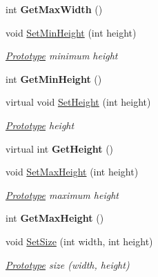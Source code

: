 \begin{DoxyCompactItemize}
int {\bfseries Get\+Max\+Width} ()
\item 
void \mbox{\hyperlink{class_space_v_i_l_1_1_prototype_ab615ad8a0985630fa96cf13d7484a4bc}{Set\+Min\+Height}} (int height)
\begin{DoxyCompactList}\small\item\em \mbox{\hyperlink{class_space_v_i_l_1_1_prototype}{Prototype}} minimum height \end{DoxyCompactList}\item 
\mbox{\label{class_space_v_i_l_1_1_prototype_ab755c8b94d71a61794208f1b3ac37b41}} 
int {\bfseries Get\+Min\+Height} ()
\item 
virtual void \mbox{\hyperlink{class_space_v_i_l_1_1_prototype_adc0adcbd1c3800d9525798ba7be5832a}{Set\+Height}} (int height)
\begin{DoxyCompactList}\small\item\em \mbox{\hyperlink{class_space_v_i_l_1_1_prototype}{Prototype}} height \end{DoxyCompactList}\item 
\mbox{\label{class_space_v_i_l_1_1_prototype_a2bd80c817b8a1708ab8f797dbebb3839}} 
virtual int {\bfseries Get\+Height} ()
\item 
void \mbox{\hyperlink{class_space_v_i_l_1_1_prototype_ae36a8ab0a4dff36218f56ae4cc9d39d4}{Set\+Max\+Height}} (int height)
\begin{DoxyCompactList}\small\item\em \mbox{\hyperlink{class_space_v_i_l_1_1_prototype}{Prototype}} maximum height \end{DoxyCompactList}\item 
\mbox{\label{class_space_v_i_l_1_1_prototype_aa8c79f15b51050a4dc941c9005530902}} 
int {\bfseries Get\+Max\+Height} ()
\item 
void \mbox{\hyperlink{class_space_v_i_l_1_1_prototype_a2f7301e72422245f5d0a72422cd48deb}{Set\+Size}} (int width, int height)
\begin{DoxyCompactList}\small\item\em \mbox{\hyperlink{class_space_v_i_l_1_1_prototype}{Prototype}} size (width, height) \end{DoxyCompactList}\item 
\mbox{\label{class_space_v_i_l_1_1_prototype_a47c40a9a789167bcae20073057630424}} 

\end{DoxyCompactItemize}
